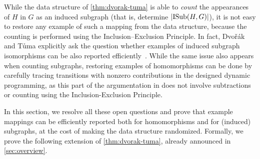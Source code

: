 While the data structure of \cref{thm:dvorak-tuma} is able to \emph{count} the appearances of $H$ in $G$ as an induced subgraph (that is, determine $|\mathrm{ISub}(H, G)|$), it is not easy to restore any example of such a mapping from the data structure, because the counting is performed using the Inclusion--Exclusion Principle. In fact, Dvo\v{r}\'ak and T\r{u}ma explicitly ask the question whether examples of induced subgraph isomorphisms can be also reported efficiently~\cite[Section~5]{DvorakT13}. While the same issue also appears when counting subgraphs, restoring examples of homomorphisms can be done by carefully tracing transitions with nonzero contributions in the designed dynamic programming, as this part of the argumentation in \cite{DvorakT13} does not involve subtractions or counting using the Inclusion-Exclusion Principle.



In this section, we resolve all these open questions and prove that example mappings can be efficiently reported both for homomorphisms and for (induced) subgraphs, at the cost of making the data structure randomized.
Formally, we prove the following extension of \cref{thm:dvorak-tuma}, already announced in \cref{sec:overview}.


\reporting*

